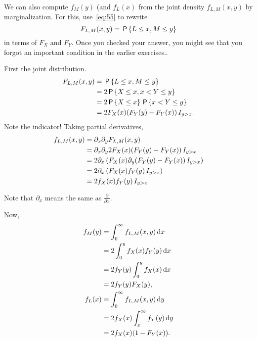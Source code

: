 \documentclass[a4paper,12pt]{article}
\begin{document}
\begin{exercise}
We can also compute $f_{M}(y)$ (and $f_{L}(x)$ from the joint density $f_{L,M}(x,y)$ by marginalization. For this, use~\cref{eq:55} to rewrite 
\begin{equation*}
  F_{L,M}(x,y) = \P{L\leq x, M\leq y}
\end{equation*}
in terms of $F_X$ and $F_Y$.
Once you checked your answer, you might see that you forgot an important condition in the earlier exercises..
\begin{solution}
First the joint distribution.
  \begin{align}
    \label{eq:51}
F_{L,M}(x,y) &= \P{L\leq x, M \leq y} \\
&= 2\P{X \leq x, x < Y \leq y} \\
&= 2\P{X \leq x} \P{x < Y \leq y} \\
&= 2 F_{X}(x) (F_Y(y)-F_Y(x)) \1{y>x}.
  \end{align}
Note the indicator! 
Taking partial derivatives,
\begin{align}
  \label{eq:52}
f_{L,M}(x,y) 
&=\partial_x\partial_{y}F_{L,M}(x,y) \\  
&=\partial_x\partial_{y}2 F_{X}(x) (F_Y(y)-F_Y(x)) \1{y>x}\\
&=2 \partial_x \left( F_{X}(x) \partial_{y} (F_Y(y)-F_Y(x))  \1 {y>x} \right) \\
&=2 \partial_x \left( F_{X}(x) f_Y(y)  \1 {y>x} \right)\\
&= 2f_X(x) f_Y(y)\1{y>x} 
\end{align}

Note that $\partial_x$ means the same as $\frac{\partial}{\partial x}$.

Now,
\begin{align}
  \label{eq:54}
  f_M(y) &=  \int_0^{\infty} f_{L,M}(x,y) \d x \\
&= 2 \int_0^{y} f_{X}(x) f_Y(y) \d x \\
&= 2 f_Y(y) \int_0^{y} f_{X}(x) \d x  \\
&= 2f_Y(y) F_X(y), \\
f_L(x) &=  \int_0^{\infty} f_{L,M}(x,y) \d y \\
&= 2 f_{X}(x) \int_x^{\infty} f_Y(y) \d y \\
&= 2 f_{X}(x) (1-F_Y(x)).
\end{align}



\end{solution}
\end{exercise}
\end{document}
